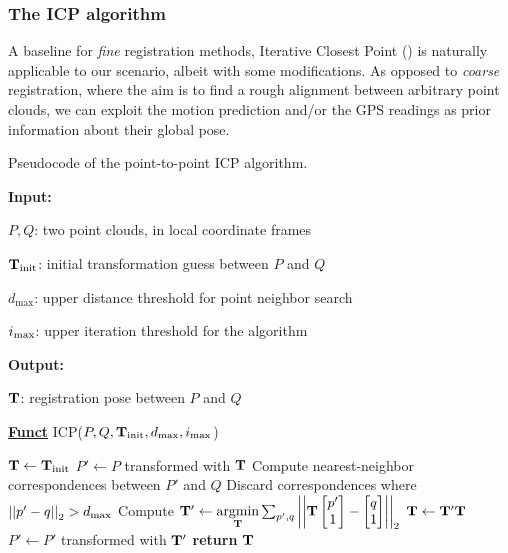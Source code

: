 \subsubsection{The ICP algorithm}
\newcommand{\pointp}{\vecx{p}}
\newcommand{\pointq}{\vecx{q}}
\newcommand{\matR}{\matx{R}}
\newcommand{\vect}{\vecx{t}}
\newcommand{\normalq}{\vecx{n}_{q}}
\newcommand{\covp}{\matx{C}_{p}}
\newcommand{\covq}{\matx{C}_{q}}
\newcommand{\distxpq}[1]{d_{#1}(\pointp, \pointq)}
\newcommand{\distpq}{\matR\pointp + \vect - \pointq}
\newcommand{\distpqi}{\matR\pointp_i + \vect - \pointq_i}
A baseline for \emph{fine} registration methods, Iterative Closest Point () is naturally applicable to our scenario, albeit with some modifications. As opposed to \emph{coarse} registration, where the aim is to find a rough alignment between arbitrary point clouds, we can exploit the motion prediction and/or the GPS readings as prior information about their global pose.

\newcommand{\distth}{d_\text{max}}
\newcommand{\tguess}{\matx{T}_\text{init}}
\begin{algorithm}
	\caption[Pseudocode of the point-to-point ICP algorithm.]{Pseudocode of the point-to-point ICP algorithm.}
	\label{alg:pseudocode-icp}

	\textbf{Input:}
	\begin{compactitem}
		\item $P, Q$: two point clouds, in local coordinate frames
		\item $\tguess$: initial transformation guess between $P$ and $Q$
		\item $\distth$: upper distance threshold for point neighbor search
		\item $i_\text{max}$: upper iteration threshold for the algorithm
	\end{compactitem}
	\textbf{Output:}
	\begin{compactitem}
		\item $\mathbf{T}$: registration pose between $P$ and $Q$
	\end{compactitem}
	\textbf{\underline{Funct}} ICP($P, Q, \tguess, \distth, \iterth$)
	\begin{algorithmic}[1] %
		\State $\pose \leftarrow \tguess$
		\State $P' \leftarrow P$ transformed with $\mathbf{T}$
		\State Compute nearest-neighbor correspondences between $P'$ and $Q$
		\State Discard correspondences where $\normtwo{p' - q} > \distth$
		\State Compute $\mathbf{T}' \leftarrow  \underset{\mathbf{T}}{\text{argmin}} \sum_{p', q}\left|\left|{\mathbf{T} \begin{bmatrix}
					p' \\1
				\end{bmatrix}  - \begin{bmatrix}q \\ 1\end{bmatrix}}\right|\right|_2$
		\State $\mathbf{T} \leftarrow \mathbf{T}'\mathbf{T}$ 
		\State $P' \leftarrow P'$ transformed with $\mathbf{T}'$ 
		\EndFor
		\State \textbf{return} $\mathbf{T}$
	\end{algorithmic}
\end{algorithm}

